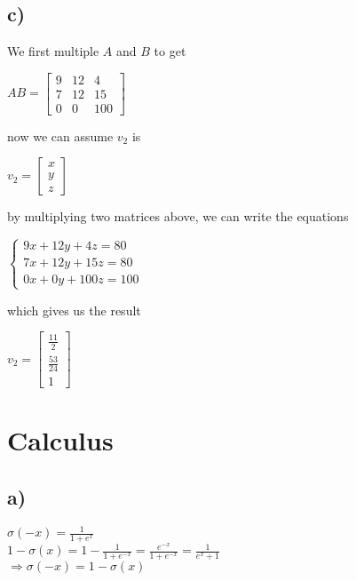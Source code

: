 \documentclass[12pt]{report}
\begin{document}
\subsection*{c)}
We first multiple $A$ and $B$ to get
\begin{center}
    $ AB = \begin{bmatrix}
      9 & 12 & 4 \\
      7 & 12 & 15 \\
      0 & 0 & 100
    \end{bmatrix} 
    $
\end{center}
now we can assume $v_{2}$ is
\begin{center}
    $ v_{2} = \begin{bmatrix}
        x \\
        y \\
        z
    \end{bmatrix}
    $
\end{center}
by multiplying two matrices above, we can write the equations
\begin{center}
    $\begin{cases}
        9x + 12y + 4z = 80 \\
        7x + 12y + 15z = 80 \\
        0x + 0y + 100z = 100
    \end{cases}$
\end{center}
which gives us the result
\begin{center}
    $ v_{2} = \begin{bmatrix}
        \frac{11}{2} \\
        \frac{53}{24} \\
        1
    \end{bmatrix}
    $
\end{center}

\section{Calculus}
\subsection*{a)}
\begin{center}
    $\sigma(-x) = \frac{1}{1+e^{x}}$ \\
    $1- \sigma(x) = 1- \frac{1}{1+e^{-x}} = \frac{e^{-x}}{1+ e^{-x}} = \frac{1}{e^{x}+1}$ \\
    $\Rightarrow \sigma(-x) = 1 - \sigma(x)$
\end{center}
\end{document}

